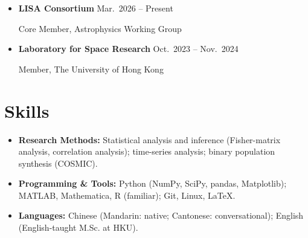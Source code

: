 \documentclass[letterpaper,11pt]{article}
\newlength{\cvEntryGap}
\newenvironment{cvEntries}{%
    \begin{itemize}[
        label={},
        leftmargin=0.15in,
        rightmargin=0pt,
        topsep=0pt,
        partopsep=0pt,
        parsep=0pt,
        itemsep=\cvEntryGap
    ]
}{%
    \end{itemize}
}
\newcommand{\cvDate}[1]{%
    {\small #1}%
}
\begin{document}
\begin{cvEntries}


    \item
    \textbf{LISA Consortium}
    \hfill
    \cvDate{Mar.\ 2026 -- Present}
    \par

    {\small
        Core Member, Astrophysics Working Group
        \par
    }


    \item
    \textbf{Laboratory for Space Research}
    \hfill
    \cvDate{Oct.\ 2023 -- Nov.\ 2024}
    \par

    {\small
        Member, The University of Hong Kong
        \par
    }

\end{cvEntries}


\section{Skills}

\begin{itemize}[
    label={},
    leftmargin=0.15in,
    topsep=0pt,
    itemsep=2pt,
    parsep=0pt
]

    \small

    \item
    \textbf{Research Methods:}
    Statistical analysis and inference
    (Fisher-matrix analysis, correlation analysis);
    time-series analysis;
    binary population synthesis (COSMIC).

    \item
    \textbf{Programming \& Tools:}
    Python (NumPy, SciPy, pandas, Matplotlib);
    MATLAB, Mathematica, R (familiar);
    Git, Linux, \LaTeX{}.

    \item
    \textbf{Languages:}
    Chinese (Mandarin: native;
    Cantonese: conversational);
    English (English-taught M.Sc. at HKU).

\end{itemize}

\end{document}
